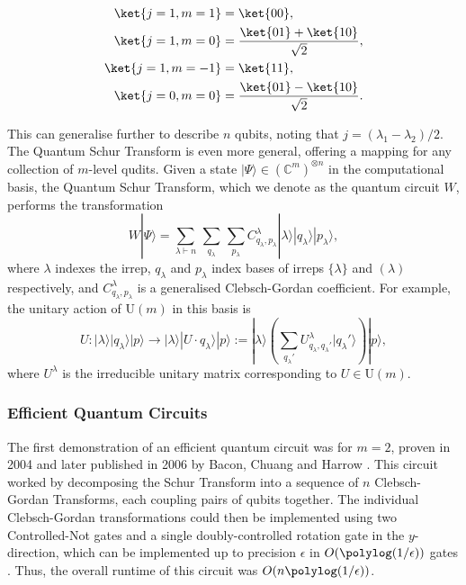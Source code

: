 \begin{align}
\ket{j=1,m=1} &= \ket{00},\\
\ket{j=1,m=0} &= \frac{\ket{01}+\ket{10}}{\sqrt{2}},\\
\ket{j=1,m=-1} &= \ket{11},\\
\ket{j=0,m=0} &= \frac{\ket{01}-\ket{10}}{\sqrt{2}}.
\end{align}

This can generalise further to describe $n$ qubits, noting that $j=(\lambda_1-\lambda_2)/2$. The Quantum Schur Transform is even more general, offering a mapping for any collection of $m$-level qudits. Given a state $|\Psi\rangle \in (\mathbb{C}^m)^{\otimes n}$ in the computational basis, the Quantum Schur Transform, which we denote as the quantum circuit $W$, performs the transformation
\begin{equation}
W|\Psi\rangle
 = \sum_{\lambda \vdash n} \, \sum_{q_{\lambda}} \, \sum_{p_\lambda}C^\lambda_{q_\lambda,p_\lambda}|\lambda\rangle|q_\lambda\rangle|p_\lambda\rangle , 
\end{equation}
where $\lambda$ indexes the irrep, $q_\lambda$ and $p_\lambda$ index bases of irreps $\{\lambda\}$ and $(\lambda)$ respectively, and $C^\lambda_{q_\lambda,p_\lambda}$ is a generalised Clebsch-Gordan coefficient.
For example, the unitary action of U$(m)$ in this basis is
\begin{equation}
U : |\lambda\rangle |q_\lambda\rangle |p\rangle \rightarrow |\lambda\rangle |U\cdot q_\lambda\rangle |p\rangle := |\lambda\rangle \left( \sum_{q_\lambda'} U^\lambda_{q_\lambda, q_\lambda'} |q_\lambda'\rangle \right) |p\rangle ,
\end{equation}
where $U^\lambda$ is the irreducible unitary matrix corresponding to $U \in \mathrm{U}(m)$.

\subsubsection{Efficient Quantum Circuits}

The first demonstration of an efficient quantum circuit was for $m=2$, proven in 2004 and later published in 2006 by Bacon, Chuang and Harrow \cite{bacon2004}. This circuit worked by decomposing the Schur Transform into a sequence of $n$ Clebsch-Gordan Transforms, each coupling pairs of qubits together. The individual Clebsch-Gordan transformations could then be implemented using two Controlled-Not gates and a single doubly-controlled rotation gate in the $y$-direction, which can be implemented up to precision $\epsilon$ in $O(\polylog(1/\epsilon))$ gates \cite{nielsen2010}. Thus, the overall runtime of this circuit was $O(n\polylog(1/\epsilon))$.

